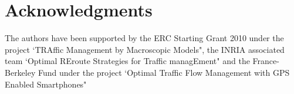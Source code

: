 \section{Acknowledgments}\label{sec:ack}

The authors have been supported by the ERC Starting Grant 2010 under the project `TRAffic
Management by Macroscopic Models", the INRIA associated team `Optimal REroute Strategies
for Traffic managEment" and the France-Berkeley Fund under the project `Optimal Traffic Flow
Management with GPS Enabled Smartphones"